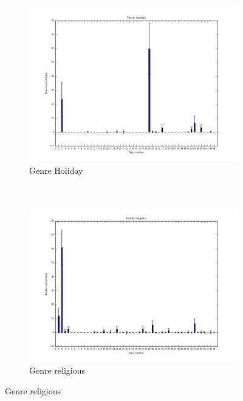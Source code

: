 \begin{figure}
        \centering
        \begin{subfigure}[b]{0.3\textwidth}
                \includegraphics[width=\textwidth]{bar_charts/holiday.png}
                \caption{Genre Holiday}
                \label{fig:topicdist_holiday}
        \end{subfigure}%
        ~ %
        \begin{subfigure}[b]{0.3\textwidth}
                \includegraphics[width=\textwidth]{bar_charts/religious.png}
                \caption{Genre religious}

\end{subfigure}
\end{figure}
